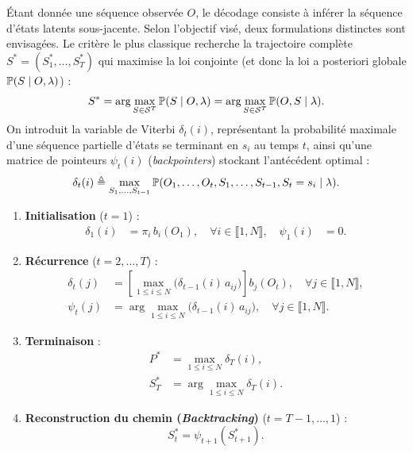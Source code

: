 Étant donnée une séquence observée $O$, le décodage consiste à inférer la séquence d'états latents sous-jacente. Selon l'objectif visé, deux formulations distinctes sont envisagées.
Le critère le plus classique recherche la trajectoire complète $S^* = (S_1^*, \dots, S_T^*)$ qui maximise la loi conjointe (et donc la loi a posteriori globale $\mathbb{P}(S \mid O, \lambda)$) :
\begin{equation}
    S^* = \arg\max_{S \in \mathcal{S}^T} \mathbb{P}(S \mid O, \lambda) = \arg\max_{S \in \mathcal{S}^T} \mathbb{P}(O, S \mid \lambda).
\end{equation}
On introduit la variable de Viterbi $\delta_t(i)$, représentant la probabilité maximale d'une séquence partielle d'états se terminant en $s_i$ au temps $t$, ainsi qu'une matrice de pointeurs $\psi_t(i)$ (\emph{backpointers}) stockant l'antécédent optimal :
\begin{equation}
    \delta_t(i) \triangleq \max_{S_1, \dots, S_{t-1}} \mathbb{P}(O_1, \dots, O_t, S_1, \dots, S_{t-1}, S_t = s_i \mid \lambda).
\end{equation}

\begin{algorithm}[H]
\caption{Algorithme de Viterbi}
\begin{enumerate}
    \item \textbf{Initialisation} ($t = 1$) :
    \begin{align}
        \delta_1(i) &= \pi_i \, b_i(O_1), \quad \forall i \in \llbracket 1, N \rrbracket, \quad 
        \psi_1(i) &= 0.
    \end{align}
    \item \textbf{Récurrence} ($t = 2, \dots, T$) :
    \begin{align}
        \delta_t(j) &= \left[ \max_{1 \le i \le N} \big( \delta_{t-1}(i) \, a_{ij} \big) \right] b_j(O_t), \quad \forall j \in \llbracket 1, N \rrbracket, \\
        \psi_t(j) &= \arg\max_{1 \le i \le N} \big( \delta_{t-1}(i) \, a_{ij} \big), \quad \forall j \in \llbracket 1, N \rrbracket.
    \end{align}
    \item \textbf{Terminaison} :
    \begin{align}
        P^* &= \max_{1 \le i \le N} \delta_T(i), \\
        S_T^* &= \arg\max_{1 \le i \le N} \delta_T(i).
    \end{align}
    \item \textbf{Reconstruction du chemin (\emph{Backtracking})} ($t = T-1, \dots, 1$) :
    \begin{equation}
        S_t^* = \psi_{t+1}(S_{t+1}^*).
    \end{equation}
\end{enumerate}
\end{algorithm}

